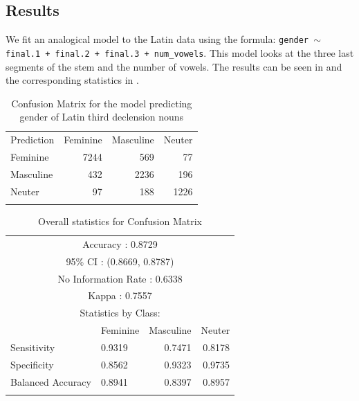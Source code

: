 \subsection{Results}

We fit an analogical model to the Latin data using the formula: \texttt{gender $\sim$ final.1\- + final.2 + final.3 + num\_vowels}. This model looks at the three last segments of the stem and the number of vowels. The results can be seen in  and the corresponding statistics in .

\begin{table}
  \centering
  \begin{tabular}{lrrr}
    \lsptoprule
    \multicolumn{4}{c}{Reference}                  \\
    \midrule
    Prediction     & Feminine & Masculine & Neuter \\
         Feminine  & 7244     & 569       & 77     \\
         Masculine & 432      & 2236      & 196    \\
         Neuter    & 97       & 188       & 1226   \\
    \lspbottomrule
  \end{tabular}
  \caption{Confusion Matrix for the model predicting gender of Latin third declension nouns}\label{tab:gender-lat}
\end{table}

\begin{table}
  \centering
  \begin{tabular}{llrr}
    \lsptoprule
    \multicolumn{4}{c}{Overall statistics:} \\

    \midrule
    \multicolumn{4}{c}{Accuracy : 0.8729}             \\
    \multicolumn{4}{c}{95\% CI : (0.8669, 0.8787)}    \\
    \multicolumn{4}{c}{No Information Rate : 0.6338}  \\
    \multicolumn{4}{c}{Kappa : 0.7557}                \\
    \midrule
    \multicolumn{4}{c}{Statistics by Class:}          \\
    \midrule
                      & Feminine & Masculine & Neuter \\
    Sensitivity       & 0.9319   & 0.7471    & 0.8178 \\
    Specificity       & 0.8562   & 0.9323    & 0.9735 \\
    Balanced Accuracy & 0.8941   & 0.8397    & 0.8957 \\
    \lspbottomrule
  \end{tabular}
  \caption{Overall statistics for Confusion Matrix }\label{tab:gender-lat-stats}
\end{table}

